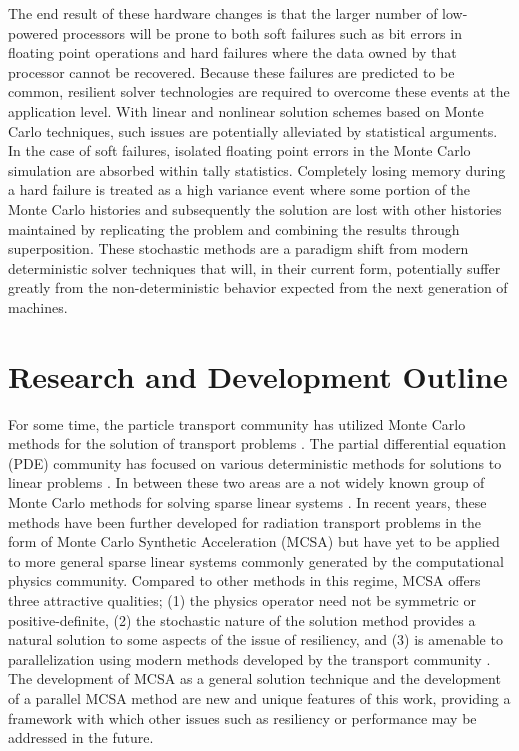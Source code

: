 The end result of these hardware changes is that the larger number of
low-powered processors will be prone to both soft failures such as bit
errors in floating point operations and hard failures where the data
owned by that processor cannot be recovered. Because these failures
are predicted to be common, resilient solver technologies are required
to overcome these events at the application level. With linear and
nonlinear solution schemes based on Monte Carlo techniques, such
issues are potentially alleviated by statistical arguments. In the
case of soft failures, isolated floating point errors in the Monte
Carlo simulation are absorbed within tally statistics. Completely
losing memory during a hard failure is treated as a high variance
event where some portion of the Monte Carlo histories and subsequently
the solution are lost with other histories maintained by replicating
the problem and combining the results through superposition. These
stochastic methods are a paradigm shift from modern deterministic
solver techniques that will, in their current form, potentially suffer
greatly from the non-deterministic behavior expected from the next
generation of machines.

\section{Research and Development Outline}
\label{sec:research_outline}
For some time, the particle transport community has utilized Monte
Carlo methods for the solution of transport problems
\cite{lewis_computational_1993}. The partial differential equation
(PDE) community has focused on various deterministic methods for
solutions to linear problems \cite{saad_iterative_2003,
  kelley_iterative_1995}. In between these two areas are a not widely
known group of Monte Carlo methods for solving sparse linear systems
\cite{forsythe_matrix_1950, hammersley_monte_1964,
  halton_sequential_1962, halton_sequential_1994}. In recent years,
these methods have been further developed for radiation transport
problems in the form of Monte Carlo Synthetic Acceleration (MCSA)
\cite{evans_monte_2009, evans_monte_2012} but have yet to be applied
to more general sparse linear systems commonly generated by the
computational physics community. Compared to other methods in this
regime, MCSA offers three attractive qualities; (1) the physics
operator need not be symmetric or positive-definite, (2) the
stochastic nature of the solution method provides a natural solution
to some aspects of the issue of resiliency, and (3) is amenable to
parallelization using modern methods developed by the transport
community \cite{wagner_hybrid_2010}. The development of MCSA as a
general solution technique and the development of a parallel MCSA
method are new and unique features of this work, providing a framework
with which other issues such as resiliency or performance may be
addressed in the future.

